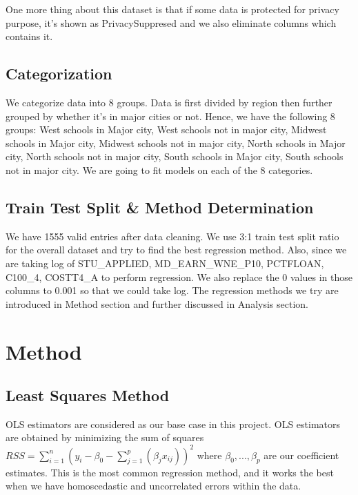 \documentclass{article}
\begin{document}
One more thing about this dataset is that if some data is protected for privacy purpose, it's shown as PrivacySuppresed and we also eliminate columns which contains it.\\

\subsection{Categorization}

We categorize data into 8 groups. Data is first divided by region then further grouped by whether it's in major cities or not. Hence, we have the following 8 groups: West schools in Major city, West schools not in major city, Midwest schools in Major city, Midwest schools not in major city, North schools in Major city, North schools not in major city, South schools in Major city, South schools not in major city. We are going to fit models on each of the 8 categories.\\

\subsection{Train Test Split \& Method Determination}

We have 1555 valid entries after data cleaning. We use 3:1 train test split ratio for the overall dataset and try to find the best regression method. Also, since we are taking log of STU\_APPLIED, MD\_EARN\_WNE\_P10, PCTFLOAN, C100\_4, COSTT4\_A to perform regression. We also replace the 0 values in those columns to 0.001 so that we could take log. The regression methods we try are introduced in Method section and further discussed in Analysis section.\\	

\section{Method}

\subsection{Least Squares Method}

OLS estimators are considered as our base case in this project. OLS estimators are obtained by minimizing the sum of squares $RSS = \sum_{i=1}^n(y_i - \beta_0 - \sum_{j=1}^p(\beta_{j}x_{ij}))^2$ where $\beta_0, ..., \beta_p$ are our coefficient estimates. This is the most common regression method, and it works the best when we have homoscedastic and uncorrelated errors within the data.
\end{document}
